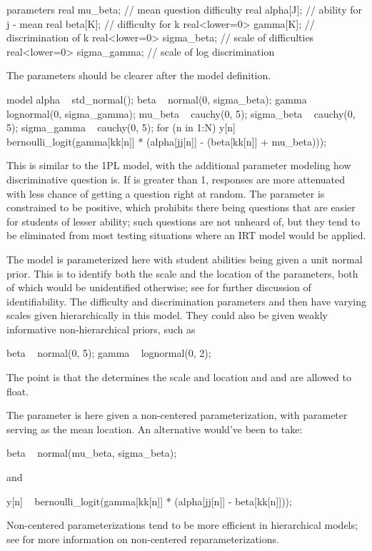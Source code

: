 \begin{stancode}
parameters {
  real mu_beta;                // mean question difficulty
  real alpha[J];               // ability for j - mean
  real beta[K];                // difficulty for k
  real<lower=0> gamma[K];      // discrimination of k
  real<lower=0> sigma_beta;    // scale of difficulties
  real<lower=0> sigma_gamma;   // scale of log discrimination
}
\end{stancode}
%
The parameters should be clearer after the model definition.
%
\begin{stancode}
model {
  alpha ~ std_normal();
  beta ~ normal(0, sigma_beta);
  gamma ~ lognormal(0, sigma_gamma);
  mu_beta ~ cauchy(0, 5);
  sigma_beta ~ cauchy(0, 5);
  sigma_gamma ~ cauchy(0, 5);
  for (n in 1:N)
    y[n] ~ bernoulli_logit(gamma[kk[n]]
                           * (alpha[jj[n]] - (beta[kk[n]] + mu_beta)));
}
\end{stancode}
%
This is similar to the 1PL model, with the additional parameter
 modeling how discriminative question  is.  If
 is greater than 1, responses are more attenuated with
less chance of getting a question right at random.  The parameter
 is constrained to be positive, which prohibits there
being questions that are easier for students of lesser ability;  such
questions are not unheard of, but they tend to be eliminated from most
testing situations where an IRT model would be applied.

The model is parameterized here with student abilities 
being given a unit normal prior.  This is to identify both the scale
and the location of the parameters, both of which would be
unidentified otherwise; see  for
further discussion of identifiability. The difficulty and
discrimination parameters  and  then have
varying scales given hierarchically in this model.  They could also be
given weakly informative non-hierarchical priors, such as
%
\begin{stancode}
  beta ~ normal(0, 5);
  gamma ~ lognormal(0, 2);
\end{stancode}
%
The point is that the  determines the scale and location
and  and  are allowed to float.

The  parameter is here given a non-centered
parameterization, with parameter  serving as the mean
 location. An alternative would've been to take:
%
\begin{stancode}
  beta ~ normal(mu_beta, sigma_beta);
\end{stancode}
%
and
%
\begin{stancode}
  y[n] ~ bernoulli_logit(gamma[kk[n]] * (alpha[jj[n]] - beta[kk[n]]));
\end{stancode}
%
Non-centered parameterizations tend to be more efficient in
hierarchical models; see  for more
information on non-centered reparameterizations.

